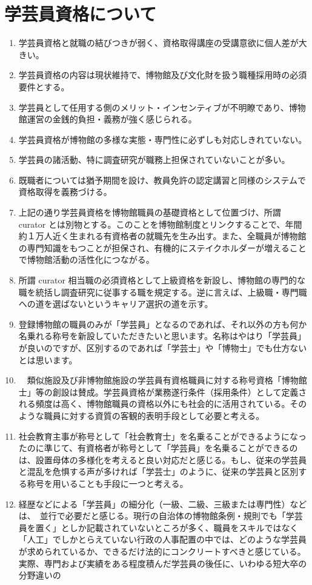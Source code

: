 \documentclass[12pt]{jsarticle}
\begin{document}
\section{学芸員資格について}
\begin{enumerate}
	\item 学芸員資格と就職の結びつきが弱く、資格取得講座の受講意欲に個人差が大きい。
	\item 学芸員資格の内容は現状維持で、博物館及び文化財を扱う職種採用時の必須要件とする。
	\item 学芸員として任用する側のメリット・インセンティブが不明瞭であり、博物館運営の金銭的負担・義務が強く感じられる。
	\item 学芸員資格が博物館の多様な実態・専門性に必ずしも対応しきれていない。
	\item 学芸員の諸活動、特に調査研究が職務上担保されていないことが多い。
	\item 既職者については猶予期間を設け、教員免許の認定講習と同様のシステムで資格取得を義務づける。
	\item 上記の通り学芸員資格を博物館職員の基礎資格として位置づけ、所謂 curator とは別物とする。このことを博物館制度とリンクすることで、年間約１万人近く生まれる有資格者の就職先を生み出す。また、全職員が博物館の専門知識をもつことが担保され、有機的にステイクホルダーが増えることで博物館活動の活性化につながる。
	\item 所謂 curator 相当職の必須資格として上級資格を新設し、博物館の専門的な職を統括し調査研究に従事する職を規定する。逆に言えば、上級職・専門職への道を選ばないというキャリア選択の道を示す。
	\item 登録博物館の職員のみが「学芸員」となるのであれば、それ以外の方も何か名乗れる称号を新設していただきたいと思います。名称はやはり「学芸員」が良いのですが、区別するのであれば「学芸士」や「博物士」でも仕方ないとは思います。
	\item　類似施設及び非博物館施設の学芸員有資格職員に対する称号資格「博物館士」等の創設は賛成。学芸員資格が業務遂行条件（採用条件）として定義される頻度は高く、博物館職員の資格以外にも社会的に活用されている。そのような職員に対する資質の客観的表明手段として必要と考える。
	\item 社会教育主事が称号として「社会教育士」を名乗ることができるようになったのに準じて、有資格者が称号として「学芸員」を名乗ることができるのは、設置母体の多様化を考えると良い対応だと感じる。もし、従来の学芸員と混乱を危惧する声が多ければ「学芸士」のように、従来の学芸員と区別する称号を用いることも手段に一つと考える。
	\item 経歴などによる「学芸員」の細分化（一級、二級、三級または専門性）などは、　並行で必要だと感じる。現行の自治体の博物館条例・規則でも「学芸員を置く」としか記載されていないところが多く、職員をスキルではなく「人工」でしかとらえていない行政の人事配置の中では、どのような学芸員が求められているか、できるだけ法的にコンクリートすべきと感じている。実際、専門および実績をある程度積んだ学芸員の後任に、いわゆる短大卒の分野違いの

\end{enumerate}
\end{document}
